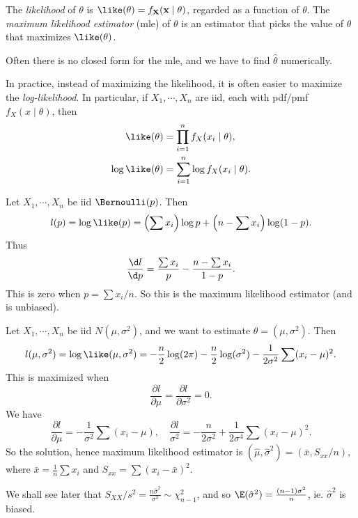 \documentclass[a4paper]{article}
\begin{document}
\begin{defi}[Likelihood]
  The \emph{likelihood} of $\theta$ is $\like(\theta) = f_\mathbf{X}(\mathbf{x} \mid \theta)$, regarded as a function of $\theta$. The \emph{maximum likelihood estimator} (mle) of $\theta$ is an estimator that picks the value of $\theta$ that maximizes $\like (\theta)$.
\end{defi}
Often there is no closed form for the mle, and we have to find $\hat{\theta}$ numerically.

In practice, instead of maximizing the likelihood, it is often easier to maximize the \emph{log-likelihood}. In particular, if $X_1, \cdots, X_n$ are iid, each with pdf/pmf $f_X(x\mid \theta)$, then
\begin{align*}
  \like(\theta) &= \prod_{i = 1}^n f_X(x_i\mid \theta),\\
  \log\like (\theta) &= \sum_{i = 1}^n \log f_X(x_i\mid \theta).
\end{align*}

\begin{eg}
  Let $X_1, \cdots, X_n$ be iid $\Bernoulli(p)$. Then
  \[
    l(p) =\log\like(p) = \left(\sum x_i\right)\log p + \left(n - \sum x_i\right)\log(1 - p).
  \]
  Thus
  \[
    \frac{\d l}{\d p} = \frac{\sum x_i}{p} - \frac{n - \sum x_i}{1 - p}.
  \]
  This is zero when $p = \sum x_i /n$. So this is the maximum likelihood estimator (and is unbiased).
\end{eg}

\begin{eg}
  Let $X_1, \cdots, X_n$ be iid $N(\mu, \sigma^2)$, and we want to estimate $\theta = (\mu, \sigma^2)$. Then
  \[
    l(\mu, \sigma^2) = \log\like(\mu, \sigma^2) = -\frac{n}{2}\log (2\pi) - \frac{n}{2}\log (\sigma^2) - \frac{1}{2\sigma^2}\sum (x_i - \mu)^2.
  \]
  This is maximized when
  \[
    \frac{\partial l}{\partial\mu} = \frac{\partial l}{\partial \sigma^2} = 0.
  \]
  We have
  \[
    \frac{\partial l}{\partial \mu} = -\frac{1}{\sigma^2}\sum (x_i - \mu), \quad \frac{\partial l}{\sigma^2} = -\frac{n}{2\sigma^2} + \frac{1}{2\sigma^4}\sum (x_i - \mu)^2.
  \]
  So the solution, hence maximum likelihood estimator is $(\hat{\mu}, \hat{\sigma}^2) = (\bar x, S_{xx}/n)$, where $\bar{x} = \frac{1}{n}\sum x_i$ and $S_{xx} = \sum(x_i - \bar{x})^2$.

  We shall see later that $S_{XX}/s^2 = \frac{n\hat{\sigma}^2}{\sigma^2}\sim \chi_{n - 1}^2$, and so $\E(\hat{\sigma}^2) = \frac{(n - 1)\sigma^2}{n}$, ie. $\hat{\sigma}^2$ is biased.
\end{eg}
\end{document}
